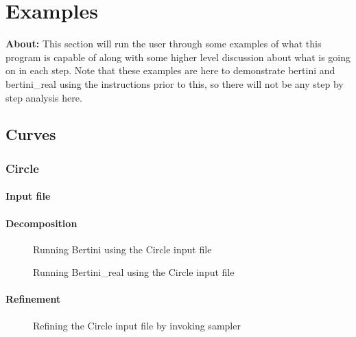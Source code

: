 
\section{Examples}

\textbf{About:} This section will run the user through some examples of what this program is capable of along with some higher level discussion about what is going on in each step. Note that these examples are here to demonstrate bertini and bertini\_real using the instructions prior to this, so there will not be any step by step analysis here.
	
\subsection{Curves}


\subsubsection{Circle}

\paragraph{Input file}


\paragraph{Decomposition}
	
	\begin{figure}[H]\centering
	     \caption{Running Bertini using the Circle input file}
	\end{figure}

	\begin{figure}[H]\centering
	     \caption{Running Bertini\_real using the Circle input file}
	\end{figure}
		
\paragraph{Refinement}

	\begin{figure}[H]\centering
	     \caption{Refining the Circle input file by invoking sampler}
	\end{figure}


